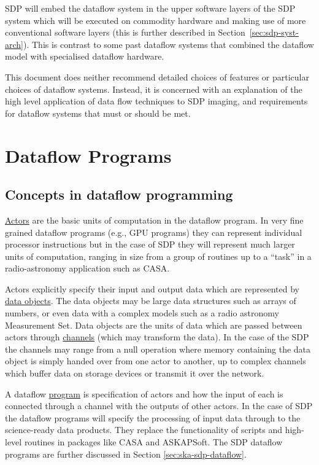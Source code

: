\documentclass[11pt,a4paper]{article}
\begin{document}
SDP will embed the dataflow system in the upper software layers of the
SDP system which will be executed on commodity hardware and making use
of more conventional software layers (this is further described in
Section~\ref{sec:sdp-syst-arch}). This is contrast to some past
dataflow systems that combined the dataflow model with specialised
dataflow hardware.

This document does neither recommend detailed choices of features or
particular choices of dataflow systems.  Instead, it is concerned with
an explanation of the high level application of data flow techniques
to SDP imaging, and requirements for dataflow systems that must or
should be met.

\section{Dataflow Programs}

\subsection{Concepts in dataflow programming}

\underline{Actors} are the basic units of computation in the dataflow
program. In very fine grained dataflow programs (e.g., GPU programs)
they can represent individual processor instructions but in the case
of SDP they will represent much larger units of computation, ranging
in size from a group of routines up to a ``task'' in a radio-astronomy
application such as CASA.  

Actors explicitly specify their input and output data which are
represented by \underline{data objects}. The data objects may be large
data structures such as arrays of numbers, or even data with a complex
models such as a radio astronomy Measurement Set. Data objects are the
units of data which are passed between actors through
\underline{channels} (which may transform the data). In the case of
the SDP the channels may range from a null operation where memory
containing the data object is simply handed over from one actor to
another, up to complex channels which buffer data on storage devices
or transmit it over the network.

A dataflow \underline{program} is specification of actors and how the
input of each is connected through a channel with the outputs of other
actors. In the case of SDP the dataflow programs will specify the
processing of input data through to the science-ready data
products. They replace the functionality of scripts and high-level
routines in packages like CASA and ASKAPSoft. The SDP dataflow
programs are further discussed in Section \ref{sec:ska-sdp-dataflow}.
\end{document}
